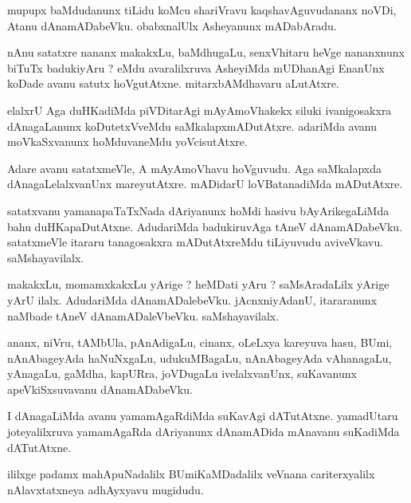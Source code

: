 \documentclass{article}
\begin{document}
\begin{mn}
mupupx baMdudanunx tiLidu koMcu shariVravu kaqshavAguvudananx noVDi, Atanu 
dAnamADabeVku. obabxnalUlx Asheyanunx mADabAradu.
\end{mn}

\begin{mn}
nAnu satatxre nananx makakxLu, baMdhugaLu,  senxVhitaru heVge nananxnunx biTuTx badukiyAru ?  eMdu 
avaralilxruva AsheyiMda mUDhanAgi EnanUnx  koDade avanu satutx hoVgutAtxne.  mitarxbAMdhavaru  aLutAtxre.
\end{mn}

\begin{mn}
elalxrU Aga duHKadiMda piVDitarAgi  mAyAmoVhakekx siluki ivanigosakxra dAnagaLanunx 
koDutetxVveMdu saMkalapxmADutAtxre.  adariMda avanu moVkaSxvanunx  hoMduvaneMdu yoVcisutAtxre.
\end{mn}

\begin{mn}
Adare avanu satatxmeVle, A mAyAmoVhavu  hoVguvudu.  Aga saMkalapxda dAnagaLelalxvanUnx 
mareyutAtxre.  mADidarU  loVBatanadiMda mADutAtxre.
\end{mn}

\begin{mn}
satatxvanu yamanapaTaTxNada dAriyanunx  hoMdi hasivu bAyArikegaLiMda bahu duHKapaDutAtxne.  
AdudariMda badukiruvAga tAneV dAnamADabeVku.  satatxmeVle  itararu tanagosakxra 
mADutAtxreMdu tiLiyuvudu aviveVkavu.  saMshayavilalx. 
\end{mn}

\begin{mn}
makakxLu, momamxkakxLu  yArige ?  heMDati yAru ?  saMsAradaLilx  yArige yArU ilalx. AdudariMda 
dAnamADalebeVku. jAcnxniyAdanU, itararanunx naMbade tAneV dAnamADaleVbeVku.  saMshayavilalx.
\end{mn}

\begin{mn}
ananx, niVru, tAMbUla, pAnAdigaLu,  cinanx,  oLeLxya kareyuva hasu, BUmi, nAnAbageyAda haNuNxgaLu, 
udukuMBagaLu, nAnAbageyAda vAhanagaLu, yAnagaLu, gaMdha, kapURra,  joVDugaLu ivelalxvanUnx,  
suKavanunx apeVkiSxsuvavanu dAnamADabeVku.
\end{mn}

\begin{mn}
I dAnagaLiMda avanu yamamAgaRdiMda suKavAgi dATutAtxne.  yamadUtaru  joteyalilxruva  
yamamAgaRda dAriyanunx dAnamADida mAnavanu suKadiMda dATutAtxne.
\end{mn}

\begin{mn}
ililxge padamx mahApuNadalilx BUmiKaMDadalilx  veVnana cariterxyalilx  nAlavxtatxneya adhAyxyavu mugidudu.
\end{mn}
\end{document}
